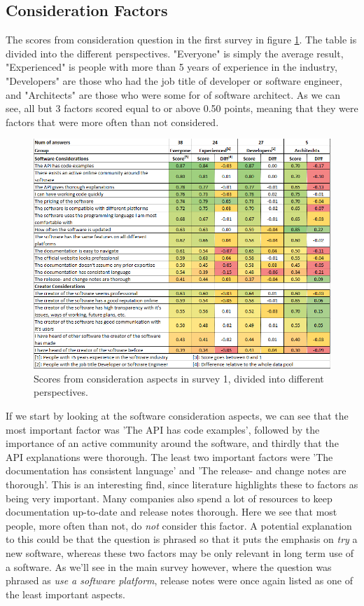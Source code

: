 \documentclass{cslthse-msc}
\begin{document}
    \subsection{Consideration Factors}
    The scores from consideration question in the first survey in figure \ref{fig:scopresByPoints}. The table is divided into the different perspectives. "Everyone" is simply the average result, "Experienced" is people with more than 5 years of experience in the industry, "Developers" are those who had the job title of developer or software engineer, and "Architects" are those who were some for of software architect.
    As we can see, all but 3 factors scored equal to or above 0.50 points, meaning that they
    were factors that were more often than not considered.
    \begin{figure}[H]
        \centering
        \includegraphics[width=\linewidth]{ScoresByPoints.png}
        \caption{Scores from consideration aspects in survey 1, divided into different perspectives.}
        \label{fig:scopresByPoints}
    \end{figure}
    If we start by looking at the software consideration aspects, we can see that the most important
    factor was 'The API has code examples', followed by the importance of an
    active community around the software, and thirdly that the API
    explanations were thorough. The least two important factors were 'The
    documentation has consistent language' and 'The release- and change
    notes are thorough'.
    This is an interesting find, since literature highlights these to factors as being very important. Many companies also spend a lot of resources to keep documentation up-to-date and release notes thorough. Here we see that most people, more often than not, do \textit{not} consider this factor. A potential explanation to this could be that the question is phrased so that it puts the emphasis on \textit{try} a new software, whereas these two factors may be only relevant in long term use of a software. As we'll see in the main survey however, where the question was phrased as \textit{use a software platform}, release notes were once again listed as one of the least important aspects.
\end{document}
